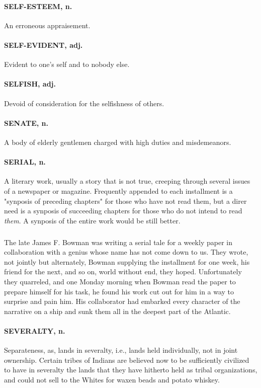 \documentclass[11pt]{article}
\begin{document}
\paragraph{SELF-ESTEEM, n.}  An erroneous appraisement.

\paragraph{SELF-EVIDENT, adj.}  Evident to one's self and to nobody else.

\paragraph{SELFISH, adj.}  Devoid of consideration for the selfishness of others.

\paragraph{SENATE, n.}  A body of elderly gentlemen charged with high duties and
misdemeanors.

\paragraph{SERIAL, n.}  A literary work, usually a story that is not true,
creeping through several issues of a newspaper or magazine.
Frequently appended to each installment is a "synposis of preceding
chapters" for those who have not read them, but a direr need is a
synposis of succeeding chapters for those who do not intend to read
{\em them}.  A synposis of the entire work would be still better.
\subparagraph{}   The late James F. Bowman was writing a serial tale for a weekly
paper in collaboration with a genius whose name has not come down to
us.  They wrote, not jointly but alternately, Bowman supplying the
installment for one week, his friend for the next, and so on, world
without end, they hoped.  Unfortunately they quarreled, and one Monday
morning when Bowman read the paper to prepare himself for his task, he
found his work cut out for him in a way to surprise and pain him.  His
collaborator had embarked every character of the narrative on a ship
and sunk them all in the deepest part of the Atlantic.

\paragraph{SEVERALTY, n.}  Separateness, as, lands in severalty, i.e., lands held
individually, not in joint ownership.  Certain tribes of Indians are
believed now to be sufficiently civilized to have in severalty the
lands that they have hitherto held as tribal organizations, and could
not sell to the Whites for waxen beads and potato whiskey.
\end{document}
